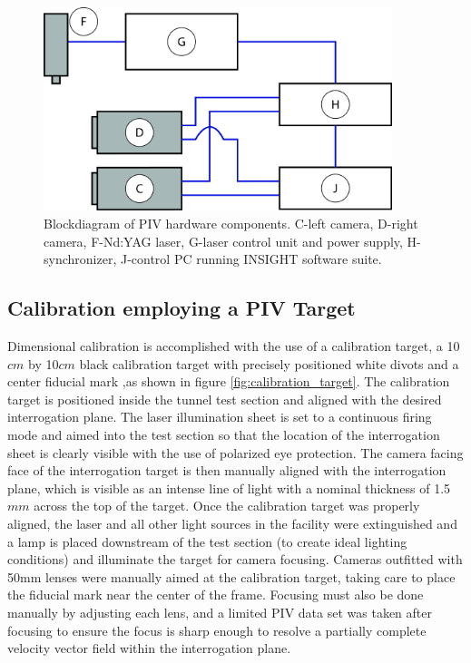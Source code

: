\begin{figure}[H]
	\centering
	\includegraphics[width=4in]{figs/piv_method/experiment_block_diagram}
	\caption{Blockdiagram of PIV hardware components. C-left camera, D-right 
		camera, F-Nd:YAG laser, G-laser control unit and power supply, 
		H-synchronizer, 
		J-control PC running INSIGHT software suite.}
	\label{fig:pivblockdiagram}
\end{figure}

\subsection{Calibration employing a PIV Target}

Dimensional calibration is accomplished with the use of a calibration target, a 
10$cm$ by 
10$cm$ black calibration target with precisely positioned white divots and a 
center fiducial mark ,as shown in figure \ref{fig:calibration_target}. The 
calibration target is 
positioned inside the tunnel test section and aligned with the desired 
interrogation plane. 
The laser illumination sheet is set to a continuous firing mode and aimed into 
the test section so that the location of the interrogation sheet is clearly 
visible with the use of polarized eye protection. The camera facing face of the 
interrogation target is then manually aligned with the interrogation plane, 
which is visible as an intense line of light with a nominal thickness of 
1.5$mm$ across the top of the target. Once the calibration target was properly 
aligned, the laser and all other light sources in the facility were 
extinguished and a lamp is placed downstream of the test section (to create 
ideal lighting conditions) and illuminate the target for camera focusing. 
Cameras outfitted with 50mm lenses were manually aimed at the calibration 
target, taking 
care to place the fiducial mark near the center of the frame. Focusing must 
also be done manually by adjusting each lens, and a limited PIV data set was 
taken after focusing to ensure the focus is sharp enough to resolve a partially 
complete velocity vector field within the interrogation plane.

